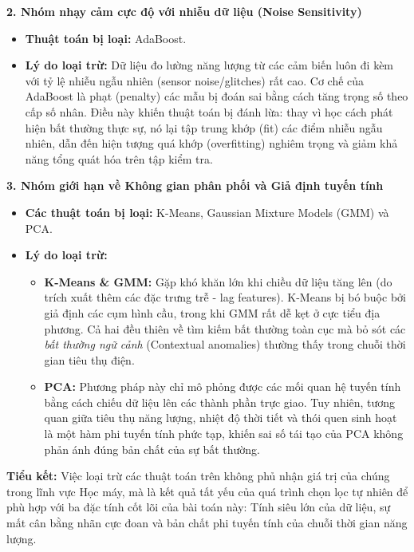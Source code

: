 \textbf{2. Nhóm nhạy cảm cực độ với nhiễu dữ liệu (Noise Sensitivity)}
\begin{itemize}
    \item \textbf{Thuật toán bị loại:} AdaBoost.
    \item \textbf{Lý do loại trừ:} Dữ liệu đo lường năng lượng từ các cảm biến luôn đi kèm với tỷ lệ nhiễu ngẫu nhiên (sensor noise/glitches) rất cao. Cơ chế của AdaBoost là phạt (penalty) các mẫu bị đoán sai bằng cách tăng trọng số theo cấp số nhân. Điều này khiến thuật toán bị đánh lừa: thay vì học cách phát hiện bất thường thực sự, nó lại tập trung khớp (fit) các điểm nhiễu ngẫu nhiên, dẫn đến hiện tượng quá khớp (overfitting) nghiêm trọng và giảm khả năng tổng quát hóa trên tập kiểm tra.
\end{itemize}

\textbf{3. Nhóm giới hạn về Không gian phân phối và Giả định tuyến tính}
\begin{itemize}
    \item \textbf{Các thuật toán bị loại:} K-Means, Gaussian Mixture Models (GMM) và PCA.
    \item \textbf{Lý do loại trừ:} 
    \begin{itemize}
        \item \textbf{K-Means \& GMM:} Gặp khó khăn lớn khi chiều dữ liệu tăng lên (do trích xuất thêm các đặc trưng trễ - lag features). K-Means bị bó buộc bởi giả định các cụm hình cầu, trong khi GMM rất dễ kẹt ở cực tiểu địa phương. Cả hai đều thiên về tìm kiếm bất thường toàn cục mà bỏ sót các \textit{bất thường ngữ cảnh} (Contextual anomalies) thường thấy trong chuỗi thời gian tiêu thụ điện.
        \item \textbf{PCA:} Phương pháp này chỉ mô phỏng được các mối quan hệ tuyến tính bằng cách chiếu dữ liệu lên các thành phần trực giao. Tuy nhiên, tương quan giữa tiêu thụ năng lượng, nhiệt độ thời tiết và thói quen sinh hoạt là một hàm phi tuyến tính phức tạp, khiến sai số tái tạo của PCA không phản ánh đúng bản chất của sự bất thường.
    \end{itemize}
\end{itemize}

\textbf{Tiểu kết:} Việc loại trừ các thuật toán trên không phủ nhận giá trị của chúng trong lĩnh vực Học máy, mà là kết quả tất yếu của quá trình chọn lọc tự nhiên để phù hợp với ba đặc tính cốt lõi của bài toán này: Tính siêu lớn của dữ liệu, sự mất cân bằng nhãn cực đoan và bản chất phi tuyến tính của chuỗi thời gian năng lượng.


